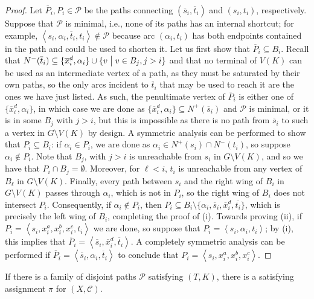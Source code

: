\documentclass[a4paper,UKenglish,cleveref, autoref, thm-restate]{lipics-v2021}
\renewcommand{\mid}{\bigm|}
\newcommand{\angled}[1]{\left\langle{#1}\right\rangle}
\newcommand{\ol}[1]{\overline{#1}}
\begin{document}
  \begin{proof}
    Let $\ol{P}_i, P_i \in \mathcal{P}$ be the paths connecting $(\ol{s}_i, \ol{t}_i)$ and
    $(s_i, t_i)$, respectively. Suppose that $\mathcal{P}$ is minimal, i.e., none of its
    paths has an internal shortcut; for example, $\angled{s_i, \alpha_i, \ol{t}_i, t_i} \notin \mathcal{P}$ because arc $(\alpha_i, t_i)$ has both endpoints contained in the path and could be used to shorten it.
    Let us first show that $\ol{P}_i \subseteq B_i$.
    Recall that $N^-(\ol{t}_i) \subseteq \{\ol{x}^d_i, \alpha_i\} \cup \{v \mid v \in
    B_j, j > i\}$ and that no terminal of
    $V(K)$ can be used as an intermediate vertex of a path,
    as they must be saturated by their own paths, so the only arcs incident to $\ol{t}_i$
    that may be used to reach it are the ones we have just listed.
    As such, the penultimate vertex of $\ol{P}_i$ is either one of $\{\ol{x}^d_i, \alpha_i\}$,
    in which case we are done as $\{\ol{x}^d_i, \alpha_i\} \subseteq N^+(\ol{s}_i)$ and
    $\mathcal{P}$ is minimal, or it is in some $B_j$ with $j > i$, but this is impossible
    as there is no path from $\ol{s}_i$ to such a vertex in $G \setminus V(K)$ by design.
    A symmetric analysis can be performed to show that $P_i \subseteq B_i$:
    if $\alpha_i \in P_i$, we are done as $\alpha_i \in N^+(s_i) \cap N^-(t_i)$, so suppose $\alpha_i \notin P_i$.
    Note that $B_j$, with $j > i$ is unreachable from $s_i$ in $G \setminus V(K)$, and so we have that $P_i \cap B_j = \emptyset$.
    Moreover, for $\ell < i$, $t_i$ is unreachable from any vertex of $B_\ell$ in $G \setminus V(K)$.
    Finally, every path between $s_i$ and the right wing of $B_i$ in $G \setminus V(K)$ passes through $\alpha_i$, which is not in $P_i$, so the right wing of $B_i$ does not intersect $P_i$.
    Consequently, if $\alpha_i \notin P_i$, then $P_i \subseteq B_i \setminus \{\alpha_i, \ol{s}_i,\ol{x}^d_i,\ol{t_i}\}$, which is precisely the left wing of $B_i$, completing the proof of (i).    
    Towards proving (ii), if $P_i = \angled{s_i, x_i^a, x_i^b, x_i^c, t_i}$ we are
    done, so suppose that $P_i = \angled{s_i, \alpha_i, t_i}$; by (i), this implies that
    $\ol{P}_i = \angled{\ol{s}_i, \ol{x}^d_i, \ol{t}_i}$.
    A completely symmetric analysis can be performed if $\ol{P}_i = \angled{\ol{s}_i, \alpha_i,
    \ol{t}_i}$ to conclude that $P_i = \angled{s_i, x_i^a, x_i^b, x_i^c}$.
  \end{proof}

  \begin{lemma}
    \label{lem:backward_tournament_nph}
    If there is a family of disjoint paths $\mathcal{P}$ satisfying $(T, K)$, there is
    a satisfying assignment $\pi$ for $(X, \mathcal{C})$.
  \end{lemma}
\end{document}
